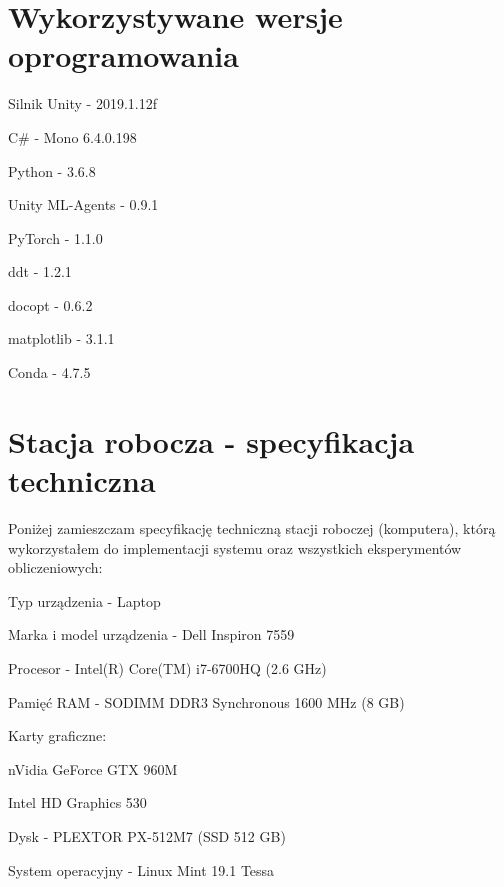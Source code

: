 \section{Wykorzystywane wersje oprogramowania}
\begin{enumerate*}
\item Silnik Unity - 2019.1.12f
\item C\# - Mono 6.4.0.198
\item Python - 3.6.8
\item Unity ML-Agents - 0.9.1
\item PyTorch - 1.1.0
\item ddt - 1.2.1
\item docopt - 0.6.2
\item matplotlib - 3.1.1
\item Conda - 4.7.5
\end{enumerate*}

\section{Stacja robocza - specyfikacja techniczna}
Poniżej zamieszczam specyfikację techniczną stacji roboczej (komputera), którą wykorzystałem do implementacji systemu oraz wszystkich eksperymentów obliczeniowych:
\begin{enumerate*}
\item Typ urządzenia - Laptop
\item Marka i model urządzenia - Dell Inspiron 7559
\item Procesor - Intel(R) Core(TM) i7-6700HQ (2.6 GHz)
\item Pamięć RAM - SODIMM DDR3 Synchronous 1600 MHz (8 GB)
\item Karty graficzne:
\begin{itemize*}
\item nVidia GeForce GTX 960M
\item Intel HD Graphics 530
\end{itemize*}
\item Dysk - PLEXTOR PX-512M7 (SSD 512 GB)
\item System operacyjny - Linux Mint 19.1 Tessa
\end{enumerate*}